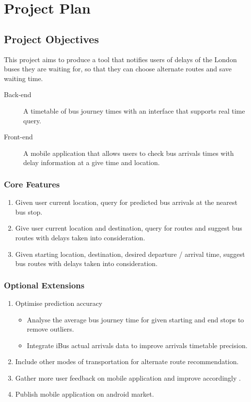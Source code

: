 \chapter{Project Plan}

\section{Project Objectives}
This project aims to produce a tool that notifies users of delays of the London buses they are waiting for, so that they can choose alternate routes and save waiting time.

\begin{description}
	\item[Back-end]  A timetable of bus journey times with an interface that supports real time query.
    \item[Front-end] A mobile application that allows users to check bus arrivals times with delay information at a give time and location. 
\end{description}

\subsection{Core Features}
    \begin{enumerate}
        \item Given user current location, query for predicted bus arrivals at the nearest bus stop.
 		\item Give user current location and destination, query for routes and suggest bus routes with delays taken into consideration.
        \item Given starting location, destination, desired departure / arrival time, suggest bus routes with delays taken into consideration.
    \end{enumerate}

\subsection{Optional Extensions}
    \begin{enumerate}
    	\item Optimise prediction accuracy 
        	\begin{itemize}
            	\item Analyse the average bus journey time for given starting and end stops to remove outliers. 
                \item Integrate iBus actual arrivals data to improve arrivals timetable precision.
            \end{itemize}
        \item Include other modes of transportation for alternate route recommendation.
        \item Gather more user feedback on mobile application and improve accordingly .
        \item Publish mobile application on android market.
    \end{enumerate}

